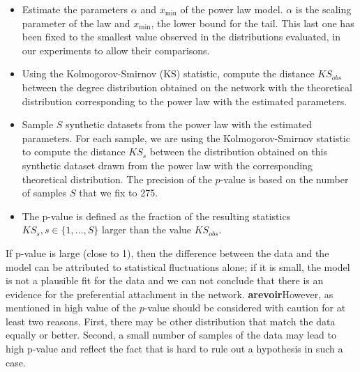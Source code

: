 \begin{itemize}
	\item Estimate the parameters $\alpha$ and $x_\text{min}$ of the power law model. $\alpha$ is the scaling parameter of the law and $x_\text{min}$, the lower bound for the tail. This last one has been fixed to the smallest value observed in the distributions evaluated, in our experiments to allow their comparisons.
	\item  Using the Kolmogorov-Smirnov (KS) statistic, compute the distance $KS_{obs}$  between the degree distribution obtained on the network with the theoretical distribution corresponding to the power law with the estimated parameters.
	\item Sample $S$ synthetic datasets from the power law with the estimated parameters. For each sample, we are using the Kolmogorov-Smirnov statistic to compute the distance $KS_{s}$ between the distribution obtained on this synthetic dataset drawn from the power law with the corresponding theoretical distribution. The precision of the $p$-value is based on the number of samples $S$ that we fix to 275. 
    \item  The p-value is defined as the fraction of  the resulting statistics $KS_s, s \in \{1,...,S\}$  larger than the value $KS_{obs}$.  
\end{itemize}

 If  p-value is large (close to 1), then the difference between the data and the model can be attributed to statistical fluctuations alone; if it is small, the model is not a plausible fit for the data and we can not conclude that there is an evidence for the preferential attachment in the network. 
\textbf{arevoir}However, as mentioned in \cite{clauset2009power} high value of the $p$-value should be considered with caution for at least two reasons. First, there may be other distribution that match the data equally or better. Second, a small number of samples of the data may lead to high p-value and reflect the fact that is hard to rule out a hypothesis in such a case.


